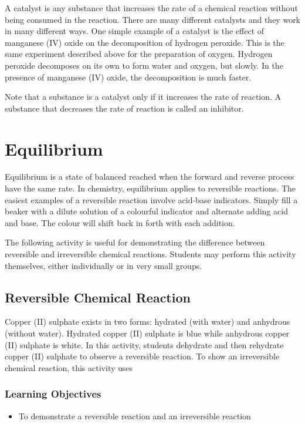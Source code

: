 A catalyst is any substance that increases the rate of a chemical reaction without being consumed in the reaction. There are many different catalysts and they work in many different ways. One simple example of a catalyst is the effect of manganese (IV) oxide on the decomposition of hydrogen peroxide. This is the same experiment described above for the preparation of oxygen. Hydrogen peroxide decomposes on its own to form water and oxygen, but slowly. In the presence of manganese (IV) oxide, the decomposition is much faster.

Note that a substance is a catalyst only if it increases the rate of reaction. A substance that decreases the rate of reaction is called an inhibitor.

\section{Equilibrium}

Equilibrium is a state of balanced reached when the forward and reverse process have the same rate. In chemistry, equilibrium applies to reversible reactions. The easiest examples of a reversible reaction involve acid-base indicators. Simply fill a beaker with a dilute solution of a colourful indicator and alternate adding acid and base. The colour will shift back in forth with each addition.

The following activity is useful for demonstrating the difference between reversible and irreversible chemical reactions. Students may perform this activity themselves, either individually or in very small groups.

\subsection{Reversible Chemical Reaction}

Copper (II) sulphate exists in two forms: hydrated (with water) and anhydrous (without water). Hydrated copper (II) sulphate is blue while anhydrous copper (II) sulphate is white. In this activity, students dehydrate and then rehydrate copper (II) sulphate to observe a reversible reaction. To show an irreversible chemical reaction, this activity uses 

\subsubsection*{Learning Objectives}
\begin{itemize}
\item{To demonstrate a reversible reaction and an irreversible reaction}
\end{itemize}

